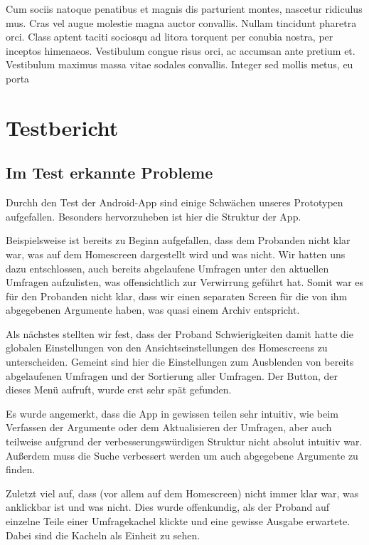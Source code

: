Cum sociis natoque penatibus et magnis dis parturient montes, nascetur ridiculus mus. Cras vel augue molestie magna auctor convallis. Nullam tincidunt pharetra orci. Class aptent taciti sociosqu ad litora torquent per conubia nostra, per inceptos himenaeos. Vestibulum congue risus orci, ac accumsan ante pretium et. Vestibulum maximus massa vitae sodales convallis. Integer sed mollis metus, eu porta

\clearpage
\section{Testbericht}
\label{sec:testbericht}

\subsection{Im Test erkannte Probleme}
\label{sec:foundproblemes}

Durchh den Test der Android-App sind einige Schwächen unseres Prototypen aufgefallen. Besonders hervorzuheben ist hier die Struktur der App.

Beispielsweise ist bereits zu Beginn aufgefallen, dass dem Probanden nicht klar war, was auf dem Homescreen dargestellt wird und was nicht. Wir hatten uns dazu entschlossen, auch bereits abgelaufene Umfragen unter den aktuellen Umfragen aufzulisten, was offensichtlich zur Verwirrung geführt hat. Somit war es für den Probanden nicht klar, dass wir einen separaten Screen für die von ihm abgegebenen Argumente haben, was quasi einem Archiv entspricht.

Als nächstes stellten wir fest, dass der Proband Schwierigkeiten damit hatte die globalen Einstellungen von den Ansichtseinstellungen des Homescreens zu unterscheiden. Gemeint sind hier die Einstellungen zum Ausblenden von bereits abgelaufenen Umfragen und der Sortierung aller Umfragen. Der Button, der dieses Menü aufruft, wurde erst sehr spät gefunden.

Es wurde angemerkt, dass die App in gewissen teilen sehr intuitiv, wie beim Verfassen der Argumente oder dem Aktualisieren der Umfragen, aber auch teilweise aufgrund der verbesserungswürdigen Struktur nicht absolut intuitiv war.
Außerdem muss die Suche verbessert werden um auch abgegebene Argumente zu finden.

Zuletzt viel auf, dass (vor allem auf dem Homescreen) nicht immer klar war, was anklickbar ist und was nicht. Dies wurde offenkundig, als der Proband auf einzelne Teile einer Umfragekachel klickte und eine gewisse Ausgabe erwartete. Dabei sind die Kacheln als Einheit zu sehen.

